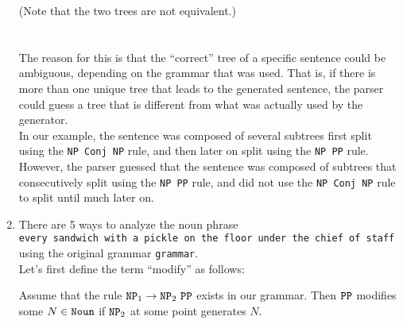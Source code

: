 \documentclass[11pt]{article}
\newcommand{\code}[1]{\texttt{#1}}
\begin{document}
\begin{enumerate}
	(Note that the two trees are not equivalent.) \vspace{4pt} \\ \\ \\
	The reason for this is that the ``correct'' tree of a specific sentence could be ambiguous, depending on the grammar that was used.  That is, if there is more than one unique tree that leads to the generated sentence, the parser could guess a tree that is different from what was actually used by the generator. \vspace{4pt} \\
In our example, the sentence was composed of several subtrees first split using the \code{NP Conj NP} rule, and then later on split using the \code{NP PP} rule. However, the parser guessed that the sentence was composed of subtrees that consecutively split using the \code{NP PP} rule, and did not use the \code{NP Conj NP} rule to split until much later on.
\newpage
\item
	There are 5 ways to analyze the noun phrase \vspace{4pt} \\
	\code{every sandwich with a pickle on the floor under the chief of staff} \vspace{4pt} \\
	using the original grammar \code{grammar}. \vspace{4pt} \\
	Let's first define the term ``modify'' as follows:
	
	Assume that the rule $\text{\code{NP}}_1 \to \text{\code{NP}}_2 \text{ \code{PP}}$ exists in our grammar. Then $\text{\code{PP}}$ modifies some $N \in \text{\code{Noun}}$ if $\text{\code{NP}}_2$ at some point generates $N$.
	

\end{enumerate}
\end{document}
